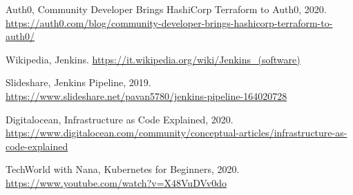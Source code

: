 \documentclass[a4paper,12pt]{report}
\begin{document}
\begin{thebibliography}{00}
Auth0, Community Developer Brings HashiCorp Terraform to Auth0, 2020. \url{https://auth0.com/blog/community-developer-brings-hashicorp-terraform-to-auth0/}

Wikipedia, Jenkins. \url{https://it.wikipedia.org/wiki/Jenkins_(software)}

Slideshare, Jenkins Pipeline, 2019. \url{https://www.slideshare.net/pavan5780/jenkins-pipeline-164020728}

Digitalocean, Infrastructure as Code Explained, 2020. \url{https://www.digitalocean.com/community/conceptual-articles/infrastructure-as-code-explained}

TechWorld with Nana, Kubernetes for Beginners, 2020. \url{https://www.youtube.com/watch?v=X48VuDVv0do}
%
%
\end{thebibliography}
% 
\end{document}
